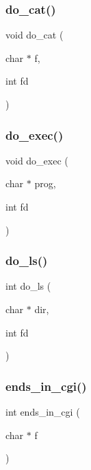 \subsubsection{\texorpdfstring{do\_cat()}{do\_cat()}}
{\footnotesize\ttfamily void do\+\_\+cat (\begin{DoxyParamCaption}\item[{char $\ast$}]{f,  }\item[{int}]{fd }\end{DoxyParamCaption})}

\mbox{\label{10b-serwer_8c_a0a305ff573da158eaa9484e5506921c0}} 
\subsubsection{\texorpdfstring{do\_exec()}{do\_exec()}}
{\footnotesize\ttfamily void do\+\_\+exec (\begin{DoxyParamCaption}\item[{char $\ast$}]{prog,  }\item[{int}]{fd }\end{DoxyParamCaption})}

\mbox{\label{10b-serwer_8c_a83999b0603c38aa5fe08f7ed801e6cfe}} 
\subsubsection{\texorpdfstring{do\_ls()}{do\_ls()}}
{\footnotesize\ttfamily int do\+\_\+ls (\begin{DoxyParamCaption}\item[{char $\ast$}]{dir,  }\item[{int}]{fd }\end{DoxyParamCaption})}

\mbox{\label{10b-serwer_8c_ad3ef3c593d3a792b02a341450eaa62dd}} 
\subsubsection{\texorpdfstring{ends\_in\_cgi()}{ends\_in\_cgi()}}
{\footnotesize\ttfamily int ends\+\_\+in\+\_\+cgi (\begin{DoxyParamCaption}\item[{char $\ast$}]{f }\end{DoxyParamCaption})}

